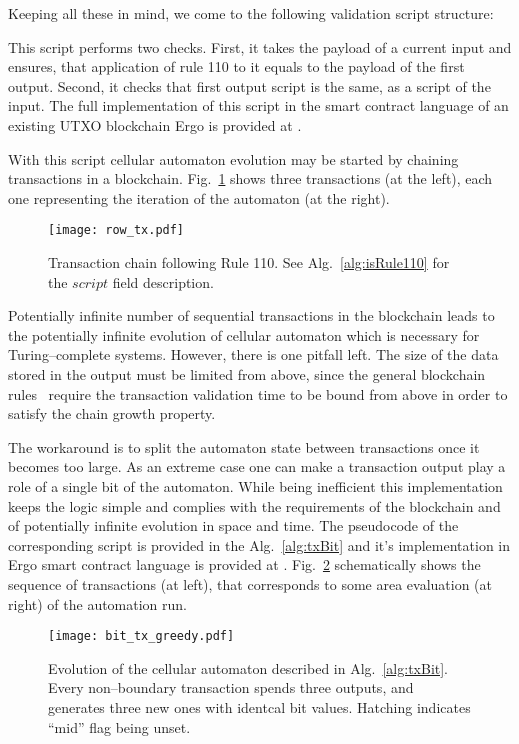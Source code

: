 \documentclass[runningheads]{llncs}
\begin{document}
    Keeping all these in mind, we come to the following validation
    script structure:
    
    This script performs two checks. First, it takes the payload of a current input
    and ensures, that application of rule 110 to it equals to the payload
    of the first output. Second, it checks that first output script is the same,
    as a script of the input. The full implementation of this script in the smart
    contract language of an existing UTXO blockchain Ergo is provided at \cite{ergoScript1}.

    With this script cellular automaton evolution may be started by
    chaining transactions in a blockchain. Fig.~\ref{fig:txs} shows three
    transactions (at the left), each one representing the iteration of the 
    automaton (at the right).

    \begin{figure}[h]
        \centering
        \texttt{[image: row\_tx.pdf]}
        \caption{Transaction chain following Rule 110. See
            Alg.~\ref{alg:isRule110} for the
            $script$ field description.
        \label{fig:txs} }
    \end{figure}
    Potentially infinite number of sequential transactions in the blockchain
    leads to the potentially infinite evolution of cellular automaton which is
    necessary for Turing--complete systems.  However, there is one pitfall left.
    The size of the data stored in the output must be limited from above, since
    the general blockchain rules~\cite{garay2015bitcoin} require the transaction
    validation time to be bound from above in order to satisfy the chain growth
    property.

    The workaround is to split the automaton state between
    transactions once it becomes too large. As an extreme case one can make a
    transaction output play a role of a single bit of the automaton. While being
    inefficient this implementation keeps the logic simple and complies with the
    requirements of the blockchain and of potentially infinite evolution in
    space and time. The pseudocode of the corresponding script is
    provided in the Alg.~\ref{alg:txBit} and it's implementation in Ergo smart
    contract language is provided at \cite{ergoScript2}. Fig.~\ref{fig:bit_txs}
    schematically shows the sequence of transactions (at left), that corresponds
    to some area evaluation (at right) of the automation run.
    \begin{figure}[h]
        \centering
        \texttt{[image: bit\_tx\_greedy.pdf]}
        \caption{Evolution of the cellular automaton described in
            Alg.~\ref{alg:txBit}. Every non--boundary transaction spends three
            outputs, and generates three new ones with identcal bit values.
            Hatching indicates ``mid'' flag being unset.
        \label{fig:bit_txs} }
    \end{figure}
    
\end{document}
